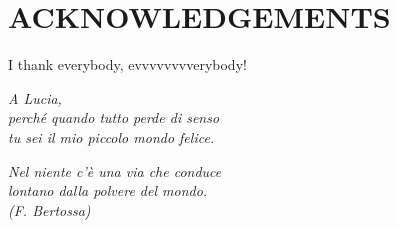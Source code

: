 %
\clearpage
\chapter*{ACKNOWLEDGEMENTS}
%
I thank everybody, evvvvvvvverybody!
%
\cleardoublepage
~

\begin{flushright}
  \emph{A Lucia, \\
  perch\'{e} quando tutto perde di senso \\
  tu sei il mio piccolo mondo felice.}
  
  \vspace{10cm}
  
   \emph{Nel niente c'\`{e} una via che conduce \\
   lontano dalla polvere del mondo.\\
   (F. Bertossa)
   } 
\end{flushright}

\cleardoublepage
